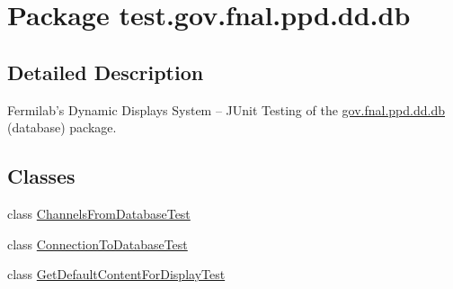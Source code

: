 \hypertarget{namespacetest_1_1gov_1_1fnal_1_1ppd_1_1dd_1_1db}{\section{Package test.\-gov.\-fnal.\-ppd.\-dd.\-db}
\label{namespacetest_1_1gov_1_1fnal_1_1ppd_1_1dd_1_1db}
}


\subsection{Detailed Description}
Fermilab's Dynamic Displays System -- J\-Unit Testing of the \hyperlink{namespacetest_1_1gov_1_1fnal_1_1ppd_1_1dd_1_1db}{gov.\-fnal.\-ppd.\-dd.\-db} (database) package.\subsection*{Classes}
\begin{DoxyCompactItemize}
\item 
class \hyperlink{classtest_1_1gov_1_1fnal_1_1ppd_1_1dd_1_1db_1_1ChannelsFromDatabaseTest}{Channels\-From\-Database\-Test}
\item 
class \hyperlink{classtest_1_1gov_1_1fnal_1_1ppd_1_1dd_1_1db_1_1ConnectionToDatabaseTest}{Connection\-To\-Database\-Test}
\item 
class \hyperlink{classtest_1_1gov_1_1fnal_1_1ppd_1_1dd_1_1db_1_1GetDefaultContentForDisplayTest}{Get\-Default\-Content\-For\-Display\-Test}
\end{DoxyCompactItemize}

